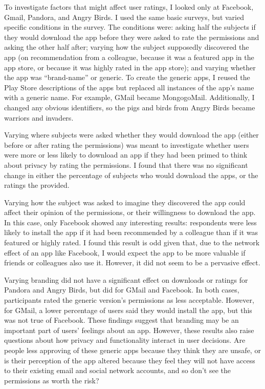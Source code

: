 \documentclass[11pt]{article}
\begin{document}
To investigate factors that might affect user ratings, I looked only at Facebook, Gmail,
Pandora, and Angry Birds.  I used the same basic surveys, but
varied specific conditions in the survey. The conditions 
were: asking half the subjects if they would download the app before 
they were asked to rate the permissions and asking the other half after; 
varying how the subject supposedly discovered the
app (on recommendation from a colleague, because it was a featured app in
the app store, or because it was highly rated in the app store); and
varying whether the app was ``brand-name'' or generic. To create the generic
apps, I reused the Play Store descriptions of the apps but replaced all
instances of the app's name with a generic name. For example, GMail
became MongogoMail.  Additionally, I changed any obvious identifiers,
so the pigs and birds from Angry Birds became warriors and invaders.

Varying where subjects were asked whether they would download the app 
(either before or after rating the permissions) was
meant to investigate whether users were more or less likely to
download an app if they had been primed to think about privacy by
rating the permissions. I found that there was no significant change
in either the percentage of subjects who would download the apps, or the
ratings the provided.

Varying how the subject was asked to imagine they discovered the app
could affect their opinion of the permissions, or their willingness to
download the app. In this case, only Facebook showed any interesting
results: respondents were less likely to install the app if it
had been recommended by a colleague than if it was featured or highly
rated. I found this result is odd given that, due to the network
effect of an app like Facebook, I would expect the app to be more
valuable if friends or colleagues also use it. However, it did not
seem to be a pervasive effect.

Varying branding did not have a significant effect on downloads or
ratings for Pandora and Angry Birds, but did 
for GMail and Facebook. In both cases,
participants rated the generic version's permissions as less
acceptable. However, for GMail, a lower percentage of users said they
would install the app, but this was not true of Facebook.  These
findings suggest that branding may be an important part of users'
feelings about an app. However, these results also raise questions
about how privacy and functionality interact in user decisions. Are
people less approving of these generic apps because they think they
are unsafe, or is their perception of the app altered because they 
feel they will not have access to their
existing email and social network accounts, 
and so don't see the permissions as worth the risk?
\end{document}
